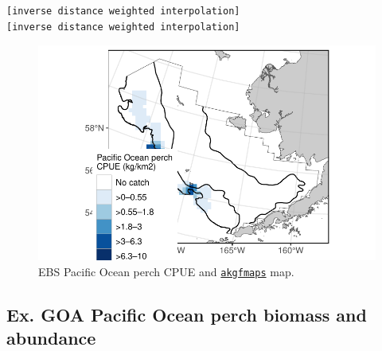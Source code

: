 \documentclass[
  letterpaper,
  oneside,
  open=any]{scrbook}
\newenvironment{Shaded}{\begin{snugshade}}{\end{snugshade}}
\newcommand{\AttributeTok}[1]{\textcolor[rgb]{0.40,0.45,0.13}{#1}}
\newcommand{\ConstantTok}[1]{\textcolor[rgb]{0.56,0.35,0.01}{#1}}
\newcommand{\FunctionTok}[1]{\textcolor[rgb]{0.28,0.35,0.67}{#1}}
\newcommand{\NormalTok}[1]{\textcolor[rgb]{0.00,0.23,0.31}{#1}}
\newcommand{\SpecialCharTok}[1]{\textcolor[rgb]{0.37,0.37,0.37}{#1}}
\newcommand{\StringTok}[1]{\textcolor[rgb]{0.13,0.47,0.30}{#1}}
\begin{document}
\begin{verbatim}
[inverse distance weighted interpolation]
[inverse distance weighted interpolation]
\end{verbatim}

\begin{Shaded}
\end{Shaded}

\begin{figure}[H]

{\centering \includegraphics{content/akfin-oracle-sql-r_files/figure-pdf/test-6-fig-1.pdf}

}

\caption{EBS Pacific Ocean perch CPUE and
\href{https://github.com/afsc-gap-products/akgfmaps}{\texttt{akgfmaps}}
map.}

\end{figure}

\hypertarget{ex.-goa-pacific-ocean-perch-biomass-and-abundance}{%
\subsection{Ex. GOA Pacific Ocean perch biomass and
abundance}\label{ex.-goa-pacific-ocean-perch-biomass-and-abundance}}
\end{document}
